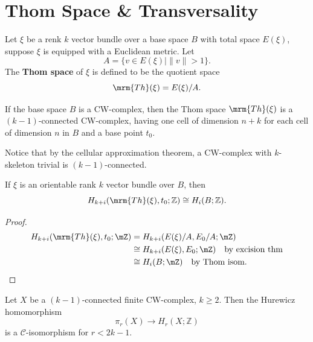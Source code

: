 \section{Thom Space \& Transversality}
\label{sec:ThomSpace&Transversality}

\begin{definition}
    Let $\xi$ be a renk $k$ vector bundle over a base space $B$ with total space $E(\xi)$, 
    suppose $\xi$ is equipped with a Euclidean metric. Let 
    \begin{equation*}
        A = \{ v \in E(\xi) \mid \|v\| > 1 \}.
    \end{equation*}
    The \textbf{Thom space} of $\xi$ is defined to be the quotient space
    \begin{equation*}
        \mrm{Th}(\xi) = E(\xi) / A.
    \end{equation*}
\end{definition}

\begin{lemma}\label{lem:CW-structure-of-Thom-space}
    If the base space $B$ is a CW-complex, then the Thom space $\mrm{Th}(\xi)$ is 
    a $(k-1)$-connected CW-complex, having one cell of dimension $n+k$ for each
    cell of dimension $n$ in $B$ and a base point $t_0$.
\end{lemma}
\begin{remark}
    Notice that by the cellular approximation theorem, 
    a CW-complex with $k$-skeleton trivial is $(k-1)$-connected.
\end{remark}

\begin{lemma}\label{lem:Homology-of-Thom-space}
    If $\xi$ is an orientable rank $k$ vector bundle over $B$, then
    \begin{equation*}
        H_{k+i}(\mrm{Th}(\xi),t_0;\mathbb{Z}) \cong H_i(B;\mathbb{Z}).
    \end{equation*}
\end{lemma}
\begin{proof}
    \begin{align*}
        H_{k+i}(\mrm{Th}(\xi),t_0;\mZ) &= 
        H_{k+i}(E(\xi)/A,E_0/A;\mZ) \\
        &\cong H_{k+i}(E(\xi),E_0;\mZ) \quad \text{by excision thm}\\
        &\cong H_i(B;\mZ) \quad \text{by Thom isom}.
    \end{align*}
\end{proof}

\begin{theorem}\label{thm:C-isom-version-Hurewicz-thm}
    Let $X$ be a $(k-1)$-connected finite CW-complex, $k\geq2$. 
    Then the Hurewicz homomorphism
    \begin{equation*}
        \pi_r(X)\to H_r(X;\mathbb{Z})
    \end{equation*}
    is a $\mathcal{C}$-isomorphism for $r<2k-1$. 
\end{theorem}

